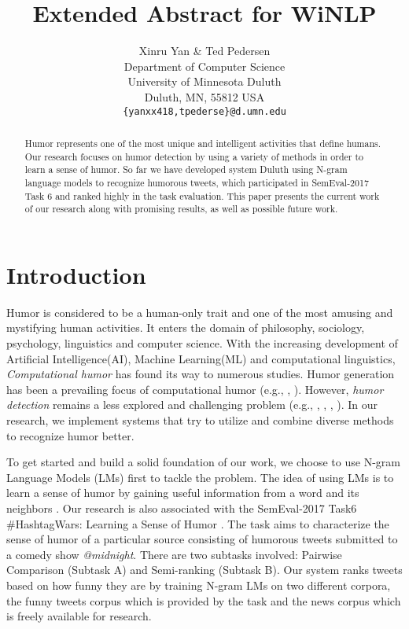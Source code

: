 \documentclass[11pt,a4paper]{article}
\title{Extended Abstract for WiNLP}
\author{Xinru Yan \& Ted Pedersen\\
  Department of Computer Science \\ University of Minnesota Duluth \\ Duluth, MN, 55812 USA \\
  {\tt \{yanxx418,tpederse\}@d.umn.edu}}
\date{}
\begin{document}
\maketitle
\begin{abstract}
Humor represents one of the most unique and intelligent activities that define humans. Our research focuses on humor detection by using a variety of methods in order to learn a sense of humor. So far we have developed system Duluth using N-gram language models to recognize humorous tweets, which participated in SemEval-2017 Task 6 and ranked highly in the task evaluation. This paper presents the current work of our research along with promising results, as well as possible future work.
\end{abstract}

\section{Introduction}
Humor is considered to be a human-only trait and one of the most amusing and mystifying human activities. It enters the domain of philosophy, sociology, psychology, linguistics and computer science. With the increasing development of Artificial Intelligence(AI), Machine Learning(ML) and computational linguistics, \textit{Computational humor} has found its way to numerous studies. Humor generation has been a prevailing focus of computational humor (e.g., \cite{StockS03}, \cite{ozbal2012computational}). However, \textit{humor detection} remains a less explored and challenging problem (e.g., \cite{Learning:To:Laugh}, \cite{Recognizing:Humor:On:Twitter}, \cite{ShahafHM15}, \cite{MillerG15}). In our research, we implement systems that try to utilize and combine diverse methods to recognize humor better.    

To get started and build a solid foundation of our work, we choose to use N-gram Language Models (LMs) first to tackle the problem. The idea of using LMs is to learn a sense of humor by gaining useful information from a word and its neighbors \cite{JM}. Our research is also associated with the SemEval-2017 Task6 \#HashtagWars: Learning a Sense of Humor \cite{PotashRR17}. The task aims to characterize the sense of humor of a particular source consisting of humorous tweets submitted to a comedy show \textit{@midnight}. There are two subtasks involved: Pairwise Comparison (Subtask A) and Semi-ranking (Subtask B). Our system ranks tweets based on how funny they are by training N-gram LMs on two different corpora, the funny tweets corpus which is provided by the task and the news corpus which is freely available for research. 
\end{document}
